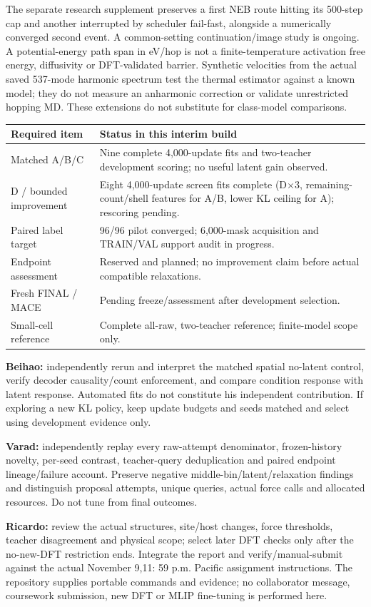 \documentclass[10pt]{article}
\begin{document}
The separate research supplement preserves a first NEB route hitting its
500-step cap and another interrupted by scheduler fail-fast, alongside a
numerically converged second event. A common-setting continuation/image study
is ongoing. A potential-energy path span in eV/hop is not a finite-temperature
activation free energy, diffusivity or DFT-validated barrier. Synthetic velocities
from the actual saved 537-mode harmonic spectrum test the thermal estimator
against a known model; they do not measure an anharmonic correction or validate
unrestricted hopping MD. These extensions do not substitute for class-model
comparisons.

\begin{center}\small
\begin{tabular}{p{.26\linewidth}p{.62\linewidth}}\toprule
Required item & Status in this interim build\\\midrule
Matched A/B/C & Nine complete 4,000-update fits and two-teacher development scoring; no useful latent gain observed.\\
D / bounded improvement & Eight 4,000-update screen fits complete (D$\times3$, remaining-count/shell features for A/B, lower KL ceiling for A); rescoring pending.\\
Paired label target & 96/96 pilot converged; 6,000-mask acquisition and TRAIN/VAL support audit in progress.\\
Endpoint assessment & Reserved and planned; no improvement claim before actual compatible relaxations.\\
Fresh FINAL / MACE & Pending freeze/assessment after development selection.\\
Small-cell reference & Complete all-raw, two-teacher reference; finite-model scope only.\\\bottomrule
\end{tabular}
\end{center}

\textbf{Beihao:} independently rerun and interpret the matched spatial no-latent
control, verify decoder causality/count enforcement, and compare condition
response with latent response. Automated fits do not constitute his independent
contribution. If exploring a new KL policy, keep update budgets and seeds matched
and select using development evidence only.

\textbf{Varad:} independently replay every raw-attempt denominator, frozen-history
novelty, per-seed contrast, teacher-query deduplication and paired endpoint
lineage/failure account. Preserve negative middle-bin/latent/relaxation findings
and distinguish proposal attempts, unique queries, actual force calls and
allocated resources. Do not tune from final outcomes.

\textbf{Ricardo:} review the actual structures, site/host changes, force thresholds,
teacher disagreement and physical scope; select later DFT checks only after
the no-new-DFT restriction ends. Integrate the report and verify/manual-submit
against the actual November 9,11: 59 p.m. Pacific assignment instructions.
The repository supplies portable commands and evidence; no collaborator message,
coursework submission, new DFT or MLIP fine-tuning is performed here.

\clearpage
\end{document}
